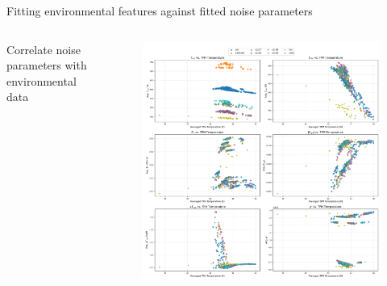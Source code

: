 \documentclass[aspectratio=169]{beamer}
\begin{document}
\begin{frame}{\small{Fitting environmental features against fitted noise parameters}}
	\begin{columns}[c]
		\begin{column}{0.45\textwidth}
			\begin{tcolorbox}[colback=blue!5!white,colframe=blue!75!black,title=]
				Correlate noise parameters with environmental data
			\end{tcolorbox}
		\end{column}
		\begin{column}{0.55\textwidth}
			\begin{figure}
				\centering
				\includegraphics[width=\textwidth]{images/pasted_image_20250605135110.png}
			\end{figure}
		\end{column}
	\end{columns}
\end{frame}

\end{document}
